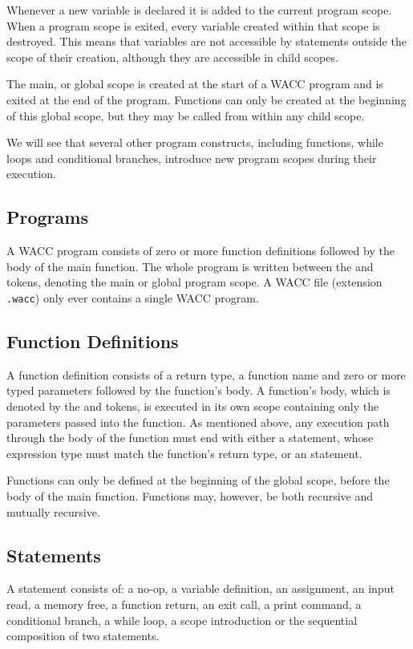 \documentclass[a4paper]{article}
\theoremstyle{definition}
\begin{document}
Whenever a new variable is declared it is added to the current program scope.
When a program scope is exited, every variable created within that scope is destroyed.
This means that variables are not accessible by statements outside the scope of their creation,
although they are accessible in child scopes.

The main, or global scope is created at the start of a WACC program and is exited at the end of the program.
Functions can only be created at the beginning of this global scope, but they may be called from within any child scope.

We will see that several other program constructs, including functions, while loops and conditional branches, 
introduce new program scopes during their execution.

\subsection{Programs}
A WACC program  consists of zero or more function definitions followed by the body of the main function. 
The whole program is written between the  and  tokens, denoting the main or global program scope.
A WACC file (extension {\tt .wacc}) only ever contains a single WACC program.

\subsection{Function Definitions}
A function definition  consists of a return type, a function name 
and zero or more typed parameters followed by the function's body.
A function's body, which is denoted by the  and  tokens, is executed in its own scope 
containing only the parameters passed into the function.
As mentioned above, any execution path through the body of the function must end with either a  statement, 
whose expression type must match the function's return type, or an  statement.

Functions can only be defined at the beginning of the global scope, before the body of the main function.
Functions may, however, be both recursive and mutually recursive.

\subsection{Statements}
A statement  consists of: 
a no-op,
a variable definition,
an assignment,
an input read,
a memory free,
a function return,
an exit call,
a print command,
a conditional branch,
a while loop,
a scope introduction
or the sequential composition of two statements.
\end{document}
